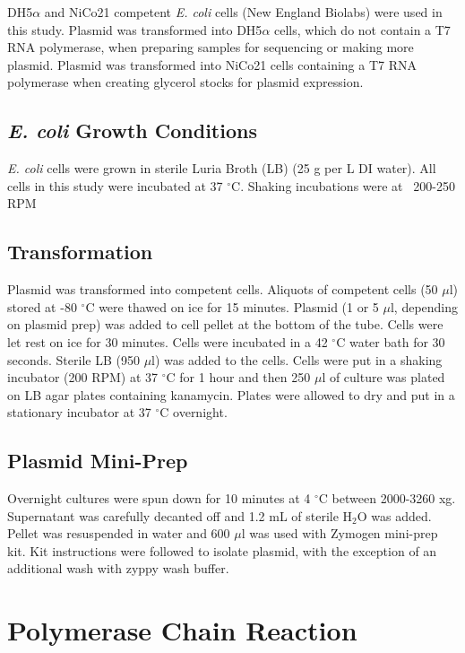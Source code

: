 \documentclass[12pt,twoside]{reedthesis}
\begin{document}
   DH5$\alpha$ and NiCo21 competent \textit{E. coli} cells (New England Biolabs) were used in this study. Plasmid was transformed into DH5$\alpha$ cells, which do not contain a T7 RNA polymerase, when preparing samples for sequencing or making more plasmid. Plasmid was transformed into NiCo21 cells containing a T7 RNA polymerase when creating glycerol stocks for plasmid expression. 
   
   \subsection{\textit{E. coli} Growth Conditions}
   \textit{E. coli} cells were grown in sterile Luria  Broth (LB) (25 g per L DI water). All cells in this study were incubated at 37 $^\circ$C. Shaking incubations were at ~200-250 RPM
   
   \subsection{Transformation}
   Plasmid was transformed into competent cells. Aliquots of competent cells (50 $\mu$l) stored at -80 $^\circ$C were thawed on ice for 15 minutes. Plasmid (1 or 5 $\mu$l, depending on plasmid prep) was added to cell pellet at the bottom of the tube. Cells were let rest on ice for 30 minutes. Cells were incubated in a 42 $^\circ$C water bath for 30 seconds. Sterile LB (950 $\mu$l) was added to the cells. Cells were put in a shaking incubator (200 RPM) at 37 $^\circ$C for 1 hour and then 250 $\mu$l of culture was plated on LB agar plates containing kanamycin. Plates were allowed to dry and put in a stationary incubator at 37 $^\circ$C overnight. 
   
   \subsection{Plasmid Mini-Prep}
   Overnight cultures were spun down for 10 minutes at 4 $^\circ$C between 2000-3260 xg. Supernatant was carefully decanted off and 1.2 mL of sterile H$_{2}$O was added. Pellet was resuspended in water and 600 $\mu$l was used with Zymogen mini-prep kit. Kit instructions were followed to isolate plasmid, with the exception of an additional wash with zyppy wash buffer. 
   
   \section{Polymerase Chain Reaction}
   
\end{document}
